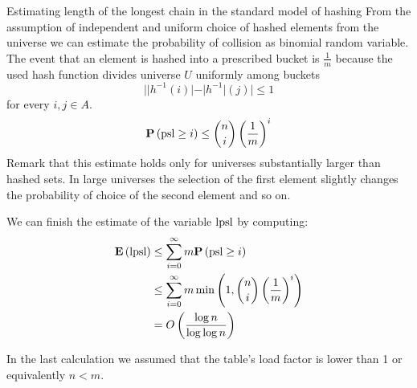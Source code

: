 \begin{section}{Estimating length of the longest chain in the standard model of hashing}
From the assumption of independent and uniform choice of hashed elements from the universe we can estimate the probability of collision as binomial random variable. The event that an element is hashed into a prescribed bucket is $\frac{1}{m}$ because the used hash function divides universe $U$ uniformly among buckets \[ ||h^{-1}(i)| - |h^{-1}|(j)| \leq 1 \] for every $i, j \in A$.
\begin{displaymath}
\mathbf{P}\left(\mathrm{psl} \geq i\right) \leq \dbinom{n}{i}\left(\frac{1}{m}\right)^i
\end{displaymath}
Remark that this estimate holds only for universes substantially larger than hashed sets. In large universes the selection of the first element slightly changes the probability of choice of the second element and so on.

We can finish the estimate of the variable $\mathrm{lpsl}$ by computing:
\begin{displaymath}
\begin{split}
\mathbf{E}\left(\mathrm{lpsl}\right)	& \leq \displaystyle \sum_{i = 0}^{\infty} m \mathbf{P}\left(\mathrm{psl} \geq i\right) \\
		& \leq \displaystyle \sum_{i = 0}^{\infty} m \min\left(1, \dbinom{n}{i}\left(\frac{1}{m}\right)^i\right) \\
		& = O\left(\frac{\log n}{\log \log n}\right)
\end{split}
\end{displaymath}

In the last calculation we assumed that the table's load factor is lower than 1 or equivalently $n < m$.
\end{section}

